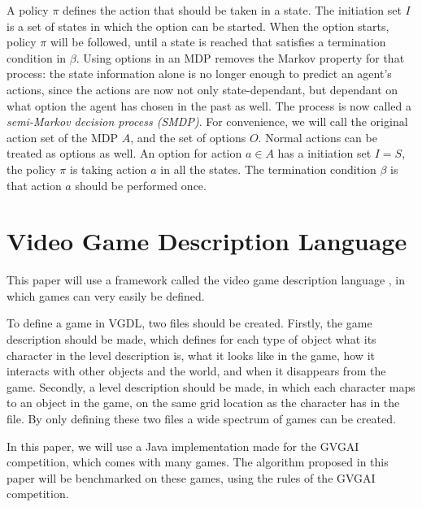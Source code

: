 A policy $\pi$ defines the action that should be taken in a state. The
initiation set $I$ is a set of states in which the option can be started. When the
option starts, policy $\pi$ will be followed, until a state is reached that
satisfies a termination condition in $\beta$. Using options in an MDP removes
the Markov property for that process: the state information alone is no longer
enough to predict an agent's actions, since the actions are now not only
state-dependant, but dependant on what option the agent has chosen in the past
as well. The process is now called a \emph{semi-Markov decision process
(SMDP)}. For convenience, we will call the original action set of the MDP $A$,
and the set of options $O$.  Normal actions can be treated as options as well.
An option for action $a \in A$ has a initiation set $I = S$, the policy $\pi$ is
taking action $a$ in all the states. The termination condition $\beta$ is that
action $a$ should be performed once.

\section{Video Game Description Language}
\label{subsec:vgdl}
This paper will use a framework called the video game description
language \cite{schaul2013video}, in which games can very easily be defined.

To define a game in VGDL, two files should be created. Firstly, the game
description should be made, which defines for each type of object what its
character in the level description is, what it looks like in the game, how it
interacts with other objects and the world, and when it disappears from the
game. Secondly, a level description should be made, in which each character maps
to an object in the game, on the same grid location as the character has in the
file. By only defining these two files a wide spectrum of games can be created.

In this paper, we will use a Java implementation made for the GVGAI competition,
which comes with many games. The algorithm proposed in this paper will be
benchmarked on these games, using the rules of the GVGAI competition. 
